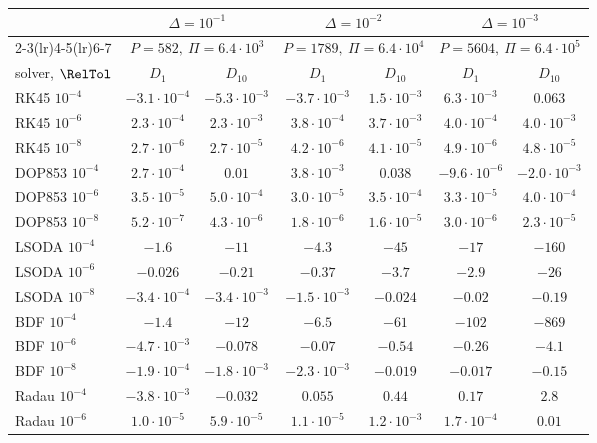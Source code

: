 \begin{tabular}{lcccccc}
\toprule
& \multicolumn{2}{c}{$\Delta=10^{-1}$} & \multicolumn{2}{c}{$\Delta=10^{-2}$} & \multicolumn{2}{c}{$\Delta=10^{-3}$}\\
\cmidrule(lr){2-3}\cmidrule(lr){4-5}\cmidrule(lr){6-7}
& \multicolumn{2}{c}{$P=582,\ \Pi=6.4\cdot10^{3}$} & \multicolumn{2}{c}{$P=1789,\ \Pi=6.4\cdot10^{4}$} & \multicolumn{2}{c}{$P=5604,\ \Pi=6.4\cdot10^{5}$}\\
solver, $\RelTol$ & $D_1$ & $D_{10}$ & $D_1$ & $D_{10}$ & $D_1$ & $D_{10}$\\
\midrule
RK45 $10^{-4}$ & $-3.1\cdot10^{-4}$ & $-5.3\cdot10^{-3}$ & $-3.7\cdot10^{-3}$ & $1.5\cdot10^{-3}$ & $6.3\cdot10^{-3}$ & $0.063$ \\
RK45 $10^{-6}$ & $2.3\cdot10^{-4}$ & $2.3\cdot10^{-3}$ & $3.8\cdot10^{-4}$ & $3.7\cdot10^{-3}$ & $4.0\cdot10^{-4}$ & $4.0\cdot10^{-3}$ \\
RK45 $10^{-8}$ & $2.7\cdot10^{-6}$ & $2.7\cdot10^{-5}$ & $4.2\cdot10^{-6}$ & $4.1\cdot10^{-5}$ & $4.9\cdot10^{-6}$ & $4.8\cdot10^{-5}$ \\
DOP853 $10^{-4}$ & $2.7\cdot10^{-4}$ & $0.01$ & $3.8\cdot10^{-3}$ & $0.038$ & $-9.6\cdot10^{-6}$ & $-2.0\cdot10^{-3}$ \\
DOP853 $10^{-6}$ & $3.5\cdot10^{-5}$ & $5.0\cdot10^{-4}$ & $3.0\cdot10^{-5}$ & $3.5\cdot10^{-4}$ & $3.3\cdot10^{-5}$ & $4.0\cdot10^{-4}$ \\
DOP853 $10^{-8}$ & $5.2\cdot10^{-7}$ & $4.3\cdot10^{-6}$ & $1.8\cdot10^{-6}$ & $1.6\cdot10^{-5}$ & $3.0\cdot10^{-6}$ & $2.3\cdot10^{-5}$ \\
LSODA $10^{-4}$ & $-1.6$ & $-11$ & $-4.3$ & $-45$ & $-17$ & $-160$ \\
LSODA $10^{-6}$ & $-0.026$ & $-0.21$ & $-0.37$ & $-3.7$ & $-2.9$ & $-26$ \\
LSODA $10^{-8}$ & $-3.4\cdot10^{-4}$ & $-3.4\cdot10^{-3}$ & $-1.5\cdot10^{-3}$ & $-0.024$ & $-0.02$ & $-0.19$ \\
BDF $10^{-4}$ & $-1.4$ & $-12$ & $-6.5$ & $-61$ & $-102$ & $-869$ \\
BDF $10^{-6}$ & $-4.7\cdot10^{-3}$ & $-0.078$ & $-0.07$ & $-0.54$ & $-0.26$ & $-4.1$ \\
BDF $10^{-8}$ & $-1.9\cdot10^{-4}$ & $-1.8\cdot10^{-3}$ & $-2.3\cdot10^{-3}$ & $-0.019$ & $-0.017$ & $-0.15$ \\
Radau $10^{-4}$ & $-3.8\cdot10^{-3}$ & $-0.032$ & $0.055$ & $0.44$ & $0.17$ & $2.8$ \\
Radau $10^{-6}$ & $1.0\cdot10^{-5}$ & $5.9\cdot10^{-5}$ & $1.1\cdot10^{-5}$ & $1.2\cdot10^{-3}$ & $1.7\cdot10^{-4}$ & $0.01$ \\

\end{tabular}
